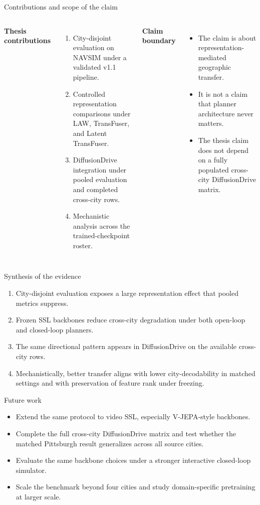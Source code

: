 \documentclass[aspectratio=169, xcolor={table}]{beamer}
\begin{document}
\begin{frame}{Contributions and scope of the claim}
  \begin{columns}[T]
    \textbf{Thesis contributions}
    \begin{enumerate}\footnotesize
      \item City-disjoint evaluation on NAVSIM under a validated v1.1 pipeline.
      \item Controlled representation comparisons under LAW, TransFuser, and Latent TransFuser.
      \item DiffusionDrive integration under pooled evaluation and completed cross-city rows.
      \item Mechanistic analysis across the trained-checkpoint roster.
    \end{enumerate}
    \textbf{Claim boundary}
    \begin{itemize}\footnotesize
      \item The claim is about representation-mediated geographic transfer.
      \item It is not a claim that planner architecture never matters.
      \item The thesis claim does not depend on a fully populated cross-city DiffusionDrive matrix.
    \end{itemize}
  \end{columns}
\end{frame}

\begin{frame}{Synthesis of the evidence}
  \begin{enumerate}
    \item City-disjoint evaluation exposes a large representation effect that pooled metrics suppress.
    \item Frozen SSL backbones reduce cross-city degradation under both open-loop and closed-loop planners.
    \item The same directional pattern appears in DiffusionDrive on the available cross-city rows.
    \item Mechanistically, better transfer aligns with lower city-decodability in matched settings and with preservation of feature rank under freezing.
  \end{enumerate}
\end{frame}

\begin{frame}{Future work}
  \begin{itemize}
    \item Extend the same protocol to video SSL, especially V-JEPA-style backbones.
    \item Complete the full cross-city DiffusionDrive matrix and test whether the matched Pittsburgh result generalizes across all source cities.
    \item Evaluate the same backbone choices under a stronger interactive closed-loop simulator.
    \item Scale the benchmark beyond four cities and study domain-specific pretraining at larger scale.
  \end{itemize}
\end{frame}
\end{document}
